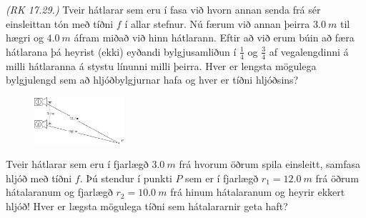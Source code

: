 \begin{enumerate}[label = \textbf{Dæmi \thechapter.\arabic*.}]
\setcounter{enumi}{35}

\item \textit{(RK 17.29.)} Tveir hátlarar sem eru í fasa við hvorn annan senda frá sér einsleittan tón með tíðni $f$ í allar stefnur. Nú færum við annan þeirra $\SI{3.0}{m}$ til hægri og $\SI{4.0}{m}$ áfram miðað við hinn hátlarann. Eftir að við erum búin að færa hátlarana þá heyrist (ekki) eyðandi bylgjusamliðun í $\frac{1}{4}$ og $\frac{3}{4}$ af vegalengdinni á milli hátlaranna á stystu línunni milli þeirra. Hver er lengsta mögulega bylgjulengd sem að hljóðbylgjurnar hafa og hver er tíðni hljóðsins?

\begin{minipage}{\linewidth}

\begin{figure}
\vspace{-0.75cm}
\includegraphics[width = 1.3in]{figures/dia-hatalar.pdf}
\end{figure}

\item Tveir hátlarar sem eru í fjarlægð $\SI{3.0}{m}$ frá hvorum öðrum spila einsleitt, samfasa hljóð með tíðni $f$. Þú stendur í punkti $P$ sem er í fjarlægð $r_1 = \SI{12.0}{m}$ frá öðrum hátalaranum og fjarlægð $r_2 = \SI{10.0}{m}$ frá hinum hátalaranum og heyrir ekkert hljóð! Hver er lægsta mögulega tíðni sem hátalararnir geta haft?


\end{minipage}
\end{enumerate}
